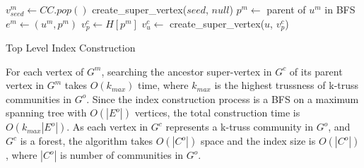 \begin{algorithm}
	\BlankLine
	 {
		$v^{m}_{seed} \gets CC.pop()$\;
		create\_super\_vertex($seed$, $null$)\;
		 {
			$p^m \gets$ parent of $u^m$ in BFS\;
			$e^m \gets (u^m, p^m)$\;
			$v^{c}_{p} \gets H[p^m]$\;
			\lWhile{$\tau_{v^{c}_{p}} > \tau_{e^m}$}{
					${v^{c}_{p}}^{\prime} \gets v^{c}_{p}$, $v^{c}_{p} \gets v^{c}_{p}.parent$
			}
			 {
				 {
					$v^{c}_{u} \gets$ create\_super\_vertex($u$, $v^{c}_{p}$)\;
				}
			}
		}
	}
	\caption{Top Level Index Construction}
	\label{alg:\treeindex{}_construction}
\end{algorithm}

For each vertex of $G^m$, searching the ancestor super-vertex in $G^c$ of its parent vertex in $G^m$ takes $O(k_{max})$ time, where $k_{max}$ is the highest trussness of k-truss communities in $G^o$. Since the index construction process is a BFS on a maximum spanning tree with $O(|E^o|)$ vertices, the total construction time is $O(k_{max}|E^o|)$. As each vertex in $G^c$ represents a k-truss community in $G^o$, and $G^c$ is a forest, the algorithm takes $O(|C^o|)$ space and the index size is $O(|C^o|)$, where $|C^o|$ is number of communities in $G^o$. 
%
%
